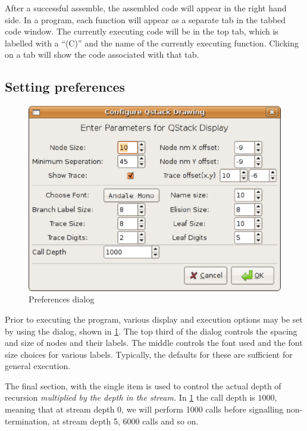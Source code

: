 After a successful assemble, the assembled code will appear in the right 
hand side. In a program, each function will appear as a separate tab in the
tabbed code window. The currently executing code will be in the top tab,
which is labelled with a ``(C)'' and the name of the currently executing 
function. Clicking on a tab will show the code associated with that tab.

\subsection{Setting preferences}

\begin{figure}[htbp]
\centering
\includegraphics[scale=.5]{images/emulator/ConfigureQstackDisplay.eps}
\caption{Preferences dialog}\label{fig:emconfigure}
\end{figure}

Prior to executing the program, various display and execution options may
be set by using the  dialog, shown in 
\ref{fig:emconfigure}. The top third of the dialog controls the spacing and
size of nodes and their labels. The middle controls the font used and the 
font size choices for various labels.  Typically, the defaults for these
are sufficient for general execution.  

The final section, with the single item  is used
to control the actual depth of recursion \emph{multiplied by the depth in
the stream.} In \ref{fig:emconfigure} the call depth is $1000$, meaning
that at stream depth 0, we will perform 1000 calls before 
signalling non-termination, at stream depth 5, 6000 calls and so on.

